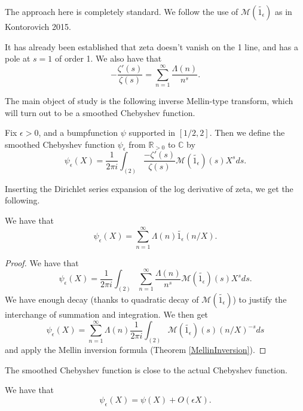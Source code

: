 
The approach here is completely standard. We follow the use of
$\mathcal{M}(\widetilde{1_{\epsilon}})$ as in Kontorovich 2015.


It has already been established that zeta doesn't vanish on the 1 line, and has a pole at $s=1$
of order 1.
We also have that
$$
-\frac{\zeta'(s)}{\zeta(s)} = \sum_{n=1}^\infty \frac{\Lambda(n)}{n^s}.
$$

The main object of study is the following inverse Mellin-type transform, which will turn out to
be a smoothed Chebyshev function.
\begin{definition}\label{SmoothedChebyshev}
Fix $\epsilon>0$, and a bumpfunction $\psi$ supported in $[1/2,2]$. Then we define the smoothed
Chebyshev function $\psi_{\epsilon}$ from $\mathbb{R}_{>0}$ to $\mathbb{C}$ by
$$\psi_{\epsilon}(X) = \frac{1}{2\pi i}\int_{(2)}\frac{-\zeta'(s)}{\zeta(s)}
\mathcal{M}(\widetilde{1_{\epsilon}})(s)
X^{s}ds.$$
\end{definition}


Inserting the Dirichlet series expansion of the log derivative of zeta, we get the following.
\begin{theorem}\label{SmoothedChebyshevDirichlet}
We have that
$$\psi_{\epsilon}(X) = \sum_{n=1}^\infty \Lambda(n)\widetilde{1_{\epsilon}}(n/X).$$
\end{theorem}


\begin{proof}
We have that
$$\psi_{\epsilon}(X) = \frac{1}{2\pi i}\int_{(2)}\sum_{n=1}^\infty \frac{\Lambda(n)}{n^s}
\mathcal{M}(\widetilde{1_{\epsilon}})(s)
X^{s}ds.$$
We have enough decay (thanks to quadratic decay of $\mathcal{M}(\widetilde{1_{\epsilon}})$) to
justify the interchange of summation and integration. We then get
$$\psi_{\epsilon}(X) =
\sum_{n=1}^\infty \Lambda(n)\frac{1}{2\pi i}\int_{(2)}
\mathcal{M}(\widetilde{1_{\epsilon}})(s)
(n/X)^{-s}
ds
$$
and apply the Mellin inversion formula (Theorem \ref{MellinInversion}).
\end{proof}


The smoothed Chebyshev function is close to the actual Chebyshev function.
\begin{theorem}[SmoothedChebyshevClose]\label{SmoothedChebyshevClose}
We have that
$$\psi_{\epsilon}(X) = \psi(X) + O(\epsilon X).$$
\end{theorem}


